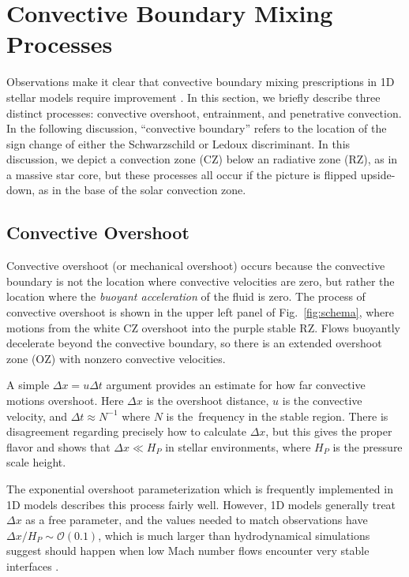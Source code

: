 \section{Convective Boundary Mixing Processes}
\label{sec:processes}

Observations make it clear that convective boundary mixing prescriptions in 1D stellar models require improvement \citep{pinsonneault_1997, claret_torres_2018, pedersen_etal_2021}.
In this section, we briefly describe three distinct processes: convective overshoot, entrainment, and penetrative convection.
In the following discussion, ``convective boundary'' refers to the location of the sign change of either the Schwarzschild or Ledoux discriminant.
In this discussion, we depict a convection zone (CZ) below an radiative zone (RZ), as in a massive star core, but these processes all occur if the picture is flipped upside-down, as in the base of the solar convection zone.

\subsection{Convective Overshoot}
Convective overshoot (or mechanical overshoot) occurs because the convective boundary is not the location where convective velocities are zero, but rather the location where the \emph{buoyant acceleration} of the fluid is zero.
The process of convective overshoot is shown in the upper left panel of Fig.~\ref{fig:schema}, where motions from the white CZ overshoot into the purple stable RZ.
Flows buoyantly decelerate beyond the convective boundary, so there is an extended overshoot zone (OZ) with nonzero convective velocities.

A simple $\Delta x = u \Delta t$ argument provides an estimate for how far convective motions overshoot.
Here $\Delta x$ is the overshoot distance, $u$ is the convective velocity, and $\Delta t \approx N^{-1}$ where $N$ is the \brunt$\,$frequency in the stable region.
There is disagreement regarding precisely how to calculate $\Delta x$, but this gives the proper flavor and shows that $\Delta x \ll H_P$ in stellar environments, where $H_P$ is the pressure scale height.

The exponential overshoot parameterization \citep[per e.g.,][]{herwig_2000} which is frequently implemented in 1D models describes this process fairly well.
However, 1D models generally treat $\Delta x$ as a free parameter, and the values needed to match observations have $\Delta x/H_P \sim \mathcal{O}(0.1)$, which is much larger than hydrodynamical simulations suggest should happen when low Mach number flows encounter very stable interfaces \citep{korre_etal_2019}.

